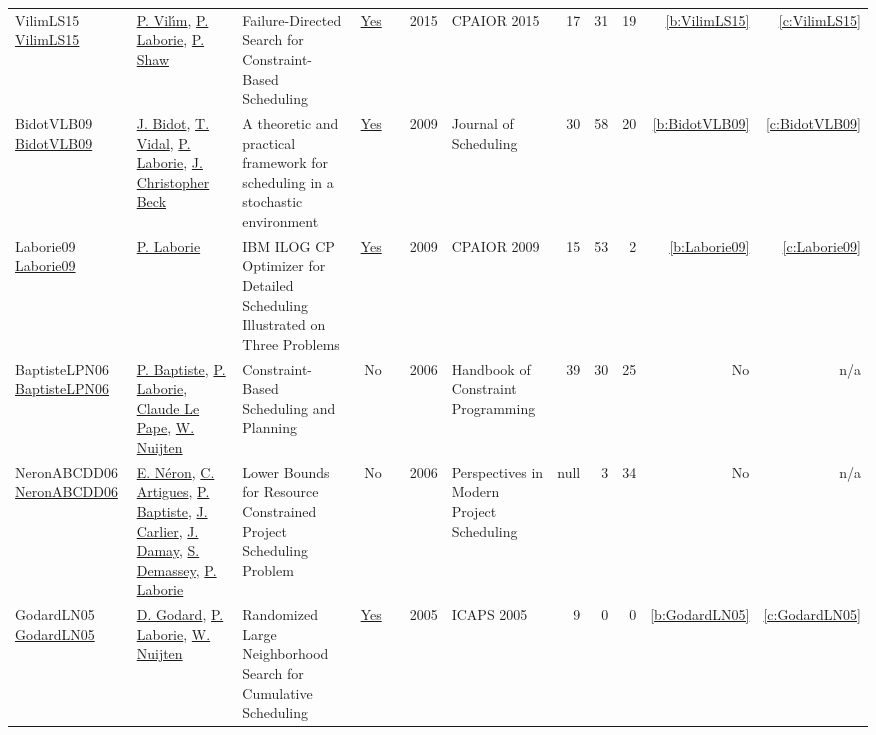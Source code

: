 {\begin{longtable}{>{\raggedright\arraybackslash}p{3cm}>{\raggedright\arraybackslash}p{6cm}>{\raggedright\arraybackslash}p{6.5cm}rrrp{2.5cm}rrrrr}
VilimLS15 \href{https://doi.org/10.1007/978-3-319-18008-3\_30}{VilimLS15} & \hyperref[auth:a121]{P. Vil{\'{\i}}m}, \hyperref[auth:a118]{P. Laborie}, \hyperref[auth:a120]{P. Shaw} & Failure-Directed Search for Constraint-Based Scheduling & \href{../works/VilimLS15.pdf}{Yes} & \cite{VilimLS15} & 2015 & CPAIOR 2015 & 17 & 31 & 19 & \ref{b:VilimLS15} & \ref{c:VilimLS15}\\
BidotVLB09 \href{https://doi.org/10.1007/s10951-008-0080-x}{BidotVLB09} & \hyperref[auth:a836]{J. Bidot}, \hyperref[auth:a837]{T. Vidal}, \hyperref[auth:a118]{P. Laborie}, \hyperref[auth:a89]{J. Christopher Beck} & A theoretic and practical framework for scheduling in a stochastic environment & \href{../works/BidotVLB09.pdf}{Yes} & \cite{BidotVLB09} & 2009 & Journal of Scheduling & 30 & 58 & 20 & \ref{b:BidotVLB09} & \ref{c:BidotVLB09}\\
Laborie09 \href{https://doi.org/10.1007/978-3-642-01929-6\_12}{Laborie09} & \hyperref[auth:a118]{P. Laborie} & {IBM} {ILOG} {CP} Optimizer for Detailed Scheduling Illustrated on Three Problems & \href{../works/Laborie09.pdf}{Yes} & \cite{Laborie09} & 2009 & CPAIOR 2009 & 15 & 53 & 2 & \ref{b:Laborie09} & \ref{c:Laborie09}\\
BaptisteLPN06 \href{https://doi.org/10.1016/S1574-6526(06)80026-X}{BaptisteLPN06} & \hyperref[auth:a164]{P. Baptiste}, \hyperref[auth:a118]{P. Laborie}, \hyperref[auth:a165]{Claude Le Pape}, \hyperref[auth:a666]{W. Nuijten} & Constraint-Based Scheduling and Planning & No & \cite{BaptisteLPN06} & 2006 & Handbook of Constraint Programming & 39 & 30 & 25 & No & n/a\\
NeronABCDD06 \href{http://dx.doi.org/10.1007/978-0-387-33768-5_7}{NeronABCDD06} & \hyperref[auth:a917]{E. Néron}, \hyperref[auth:a6]{C. Artigues}, \hyperref[auth:a164]{P. Baptiste}, \hyperref[auth:a858]{J. Carlier}, \hyperref[auth:a918]{J. Damay}, \hyperref[auth:a246]{S. Demassey}, \hyperref[auth:a118]{P. Laborie} & Lower Bounds for Resource Constrained Project Scheduling Problem & No & \cite{NeronABCDD06} & 2006 & Perspectives in Modern Project Scheduling & null & 3 & 34 & No & n/a\\
GodardLN05 \href{http://www.aaai.org/Library/ICAPS/2005/icaps05-009.php}{GodardLN05} & \hyperref[auth:a783]{D. Godard}, \hyperref[auth:a118]{P. Laborie}, \hyperref[auth:a666]{W. Nuijten} & Randomized Large Neighborhood Search for Cumulative Scheduling & \href{../works/GodardLN05.pdf}{Yes} & \cite{GodardLN05} & 2005 & ICAPS 2005 & 9 & 0 & 0 & \ref{b:GodardLN05} & \ref{c:GodardLN05}\\

\end{longtable}}
